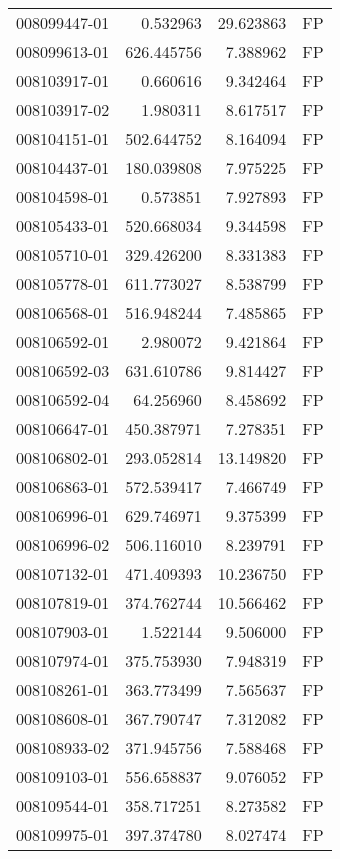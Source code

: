 \begin{tabular}{lrrl}
008099447-01 &    0.532963 &    29.623863 &   FP \\
008099613-01 &  626.445756 &     7.388962 &   FP \\
008103917-01 &    0.660616 &     9.342464 &   FP \\
008103917-02 &    1.980311 &     8.617517 &   FP \\
008104151-01 &  502.644752 &     8.164094 &   FP \\
008104437-01 &  180.039808 &     7.975225 &   FP \\
008104598-01 &    0.573851 &     7.927893 &   FP \\
008105433-01 &  520.668034 &     9.344598 &   FP \\
008105710-01 &  329.426200 &     8.331383 &   FP \\
008105778-01 &  611.773027 &     8.538799 &   FP \\
008106568-01 &  516.948244 &     7.485865 &   FP \\
008106592-01 &    2.980072 &     9.421864 &   FP \\
008106592-03 &  631.610786 &     9.814427 &   FP \\
008106592-04 &   64.256960 &     8.458692 &   FP \\
008106647-01 &  450.387971 &     7.278351 &   FP \\
008106802-01 &  293.052814 &    13.149820 &   FP \\
008106863-01 &  572.539417 &     7.466749 &   FP \\
008106996-01 &  629.746971 &     9.375399 &   FP \\
008106996-02 &  506.116010 &     8.239791 &   FP \\
008107132-01 &  471.409393 &    10.236750 &   FP \\
008107819-01 &  374.762744 &    10.566462 &   FP \\
008107903-01 &    1.522144 &     9.506000 &   FP \\
008107974-01 &  375.753930 &     7.948319 &   FP \\
008108261-01 &  363.773499 &     7.565637 &   FP \\
008108608-01 &  367.790747 &     7.312082 &   FP \\
008108933-02 &  371.945756 &     7.588468 &   FP \\
008109103-01 &  556.658837 &     9.076052 &   FP \\
008109544-01 &  358.717251 &     8.273582 &   FP \\
008109975-01 &  397.374780 &     8.027474 &   FP \\

\end{tabular}
